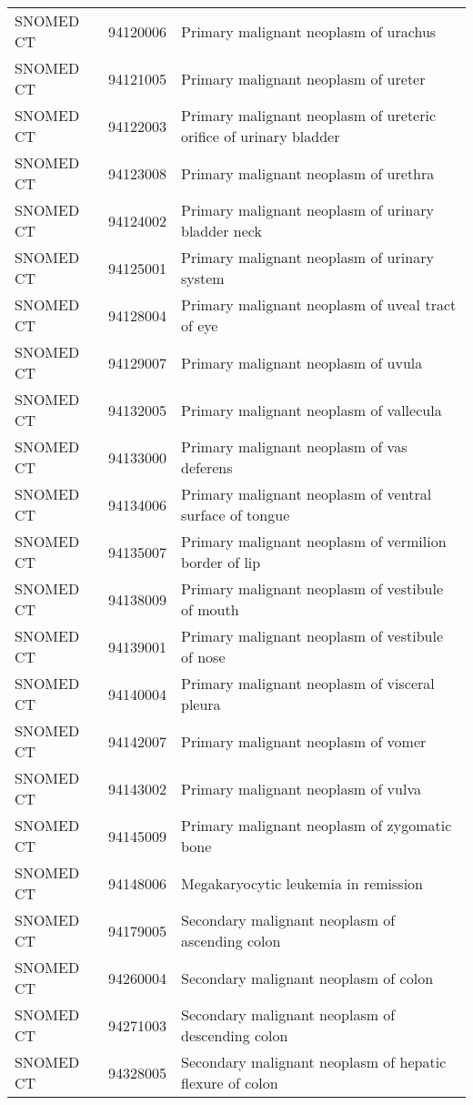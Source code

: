\begin{longtable}{p{}p{}p{}}
  SNOMED CT & 94120006 & Primary malignant neoplasm of urachus \\ 
  SNOMED CT & 94121005 & Primary malignant neoplasm of ureter \\ 
  SNOMED CT & 94122003 & Primary malignant neoplasm of ureteric orifice of urinary bladder \\ 
  SNOMED CT & 94123008 & Primary malignant neoplasm of urethra \\ 
  SNOMED CT & 94124002 & Primary malignant neoplasm of urinary bladder neck \\ 
  SNOMED CT & 94125001 & Primary malignant neoplasm of urinary system \\ 
  SNOMED CT & 94128004 & Primary malignant neoplasm of uveal tract of eye \\ 
  SNOMED CT & 94129007 & Primary malignant neoplasm of uvula \\ 
  SNOMED CT & 94132005 & Primary malignant neoplasm of vallecula \\ 
  SNOMED CT & 94133000 & Primary malignant neoplasm of vas deferens \\ 
  SNOMED CT & 94134006 & Primary malignant neoplasm of ventral surface of tongue \\ 
  SNOMED CT & 94135007 & Primary malignant neoplasm of vermilion border of lip \\ 
  SNOMED CT & 94138009 & Primary malignant neoplasm of vestibule of mouth \\ 
  SNOMED CT & 94139001 & Primary malignant neoplasm of vestibule of nose \\ 
  SNOMED CT & 94140004 & Primary malignant neoplasm of visceral pleura \\ 
  SNOMED CT & 94142007 & Primary malignant neoplasm of vomer \\ 
  SNOMED CT & 94143002 & Primary malignant neoplasm of vulva \\ 
  SNOMED CT & 94145009 & Primary malignant neoplasm of zygomatic bone \\ 
  SNOMED CT & 94148006 & Megakaryocytic leukemia in remission \\ 
  SNOMED CT & 94179005 & Secondary malignant neoplasm of ascending colon \\ 
  SNOMED CT & 94260004 & Secondary malignant neoplasm of colon \\ 
  SNOMED CT & 94271003 & Secondary malignant neoplasm of descending colon \\ 
  SNOMED CT & 94328005 & Secondary malignant neoplasm of hepatic flexure of colon \\ 

\end{longtable}
